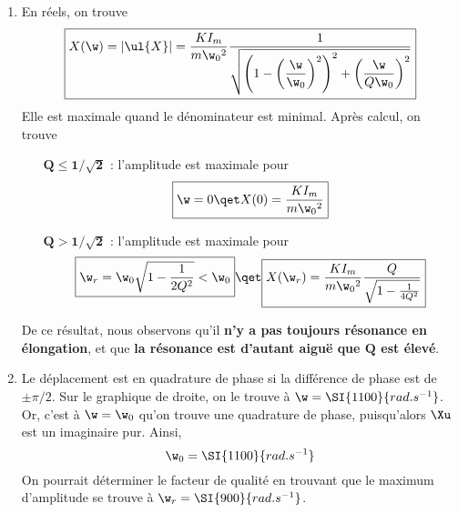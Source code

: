 \documentclass[a4paper, 12pt, final, garamond]{book}
\begin{document}
\begin{enumerate}
    \item En réels, on trouve
        \begin{gather*}
            \boxed{
            X(\w)
                = \left| \ul{X} \right|
                = \frac{KI_m}{m\w_0{}^2}\frac{1}{
                        \sqrt{\left( 1 - \left(\dfrac{\w}{\w_0}\right)^2 \right)^2
                        + \left(\dfrac{\w}{Q\w_0}\right)^2}}
            }
        \end{gather*}
        Elle est maximale quand le dénominateur est minimal. Après calcul,
        on trouve
        \begin{itemize}[leftmargin=60pt]
            \item[$\mathbf{Q \leq 1/\sqrt{2}}$] : l'amplitude est maximale pour
                \[\boxed{\w = 0 \qet X(0) = \frac{KI_m}{m\w_0{}^2}}\]
            \item[$\mathbf{Q > 1/\sqrt{2}}$] : l'amplitude est maximale pour
                \[\boxed{\w_r = \w_0 \sqrt{1 - \frac{1}{2Q^2}} < \w_0}
                    \qet
                    \boxed{X(\w_r) = \frac{KI_m}{m\w_0{}^2}
                        \frac{Q}{\sqrt{1 - \frac{1}{4Q^2}}}}
                \]
        \end{itemize}
        De ce résultat, nous observons qu'il \textbf{n'y a pas toujours
        résonance en élongation}, et que \textbf{la résonance est d'autant
        aiguë que $\mathbf{Q}$ est élevé}.
    \item Le déplacement est en quadrature de phase si la différence de phase
        est de $\pm\pi/2$. Sur le graphique de droite, on le trouve à $\w =
        \SI{1100}{rad.s^{-1}}$. Or, c'est à $\w = \w_0$ qu'on trouve une
        quadrature de phase, puisqu'alors $\Xu$ est un imaginaire pur. Ainsi,
        \[\w_0 = \SI{1100}{rad.s^{-1}}\]
        On pourrait déterminer le facteur de qualité en trouvant que le maximum
        d'amplitude se trouve à $\w_r = \SI{900}{rad.s^{-1}}$.
\end{enumerate}
\end{document}
